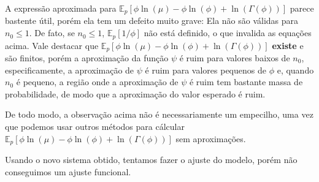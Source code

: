 \documentclass[
]{article}
\begin{document}
A expressão aproximada para
\(\mathbb{E}_{p}[\phi\ln(\mu)-\phi\ln(\phi)+\ln(\Gamma(\phi))]\) parece
bastente útil, porém ela tem um defeito muito grave: Ela não são válidas
para \(n_0\le1\). De fato, se \(n_0\le1\), \(\mathbb{E}_{p}[1/\phi]\)
não está definido, o que invalida as equações acima. Vale destacar que
\(\mathbb{E}_{p}[\phi\ln(\mu)-\phi\ln(\phi)+\ln(\Gamma(\phi))]\)
\textbf{existe} e são finitos, porém a aproximação da função \(\psi\) é
ruim para valores baixos de \(n_0\), especificamente, a aproximação de
\(\psi\) é ruim para valores pequenos de \(\phi\) e, quando \(n_0\) é
pequeno, a região onde a aproximação de \(\psi\) é ruim tem bastante
massa de probabilidade, de modo que a aproximação do valor esperado é
ruim.

De todo modo, a observação acima não é necessariamente um empecilho, uma
vez que podemos usar outros métodos para cálcular
\(\mathbb{E}_{p}[\phi\ln(\mu)-\phi\ln(\phi)+\ln(\Gamma(\phi))]\) sem
aproximações.

Usando o novo sistema obtido, tentamos fazer o ajuste do modelo, porém
não conseguimos um ajuste funcional.
\end{document}
